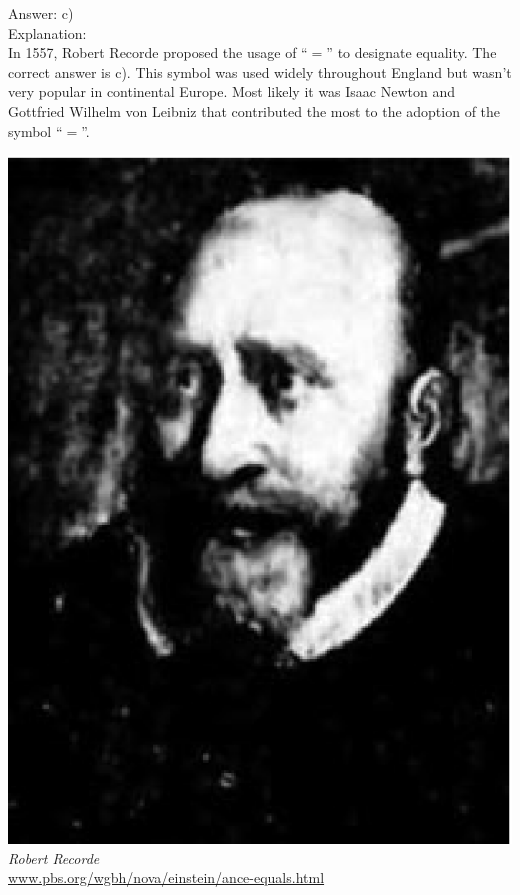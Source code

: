 \documentclass[letterpaper, 12pt]{article}
\begin{document}
Answer: c)\\

Explanation:\\
In 1557, Robert Recorde proposed the usage of  ``$=$'' to designate equality. The correct answer is c). This symbol was used widely throughout England but wasn't very popular in continental Europe. Most likely it was Isaac Newton and Gottfried Wilhelm von Leibniz that contributed the most to the adoption of the symbol ``$=$''.\\

\begin{center}
\includegraphics[scale=0.4]{recorde.eps}\\
\emph{{\small Robert Recorde}}\\
\href{http://www.pbs.org/wgbh/nova/einstein/ance-equals.html}{www.pbs.org/wgbh/nova/einstein/ance-equals.html}\\[5mm]
\end{center}
\end{document}

